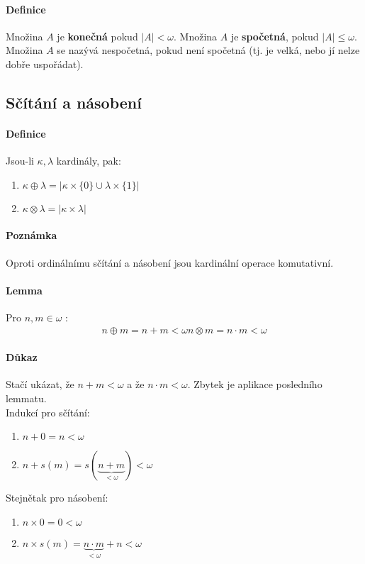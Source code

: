 \documentclass[a4paper,12pt,titlepage]{article}
\begin{document}
\paragraph{Definice}
Množina $A$ je \textbf{konečná} pokud $|A| \lt \omega$. Množina $A$ je
\textbf{spočetná}, pokud $|A| \le \omega$. Množina $A$ se nazývá nespočetná, pokud
není spočetná (tj. je velká, nebo jí nelze dobře uspořádat).
\subsection{Sčítání a násobení}
\setcounter{equation}{0}
\paragraph{Definice}
Jsou-li $\kappa, \lambda$ kardinály, pak:
\begin{enumerate}
	\item $\kappa \oplus \lambda = |\kappa \times\{0\} \cup \lambda\times\{1\}|$
	\item $\kappa \otimes \lambda = |\kappa \times \lambda|$
\end{enumerate}
\paragraph{Poznámka}
Oproti ordinálnímu sčítání a násobení jsou kardinální operace komutativní.
\paragraph{Lemma}
Pro $n,m \in \omega$ :
\begin{align}
	n \oplus m = n + m < \omega
	n \otimes m = n \cdot m < \omega
\end{align}
\paragraph{Důkaz}
Stačí ukázat, že $n+m < \omega$ a že $n \cdot m < \omega$. Zbytek je aplikace
posledního lemmatu. \\
Indukcí pro sčítání:
\begin{enumerate}
	\item $n+0 = n < \omega$
	\item $n + s(m) = s(\underbrace{n+m}_{<\omega}) < \omega$ 
\end{enumerate}
Stejnětak pro násobení:
\begin{enumerate}
	\item $n\times 0 = 0 < \omega$
	\item $n \times s(m) = \underbrace{n \cdot m}_{<\omega} + n < \omega$
\end{enumerate}
\end{document}
